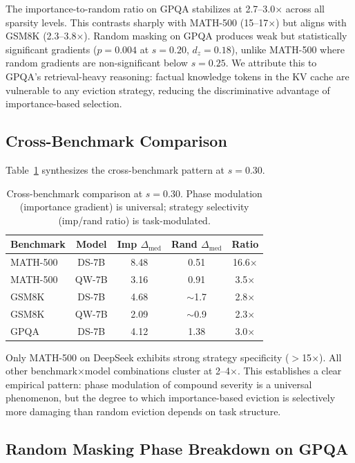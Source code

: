 \documentclass[11pt,a4paper]{article}
\begin{document}
The importance-to-random ratio on GPQA stabilizes at 2.7--3.0$\times$ across all sparsity levels. This contrasts sharply with MATH-500 (15--17$\times$) but aligns with GSM8K (2.3--3.8$\times$). Random masking on GPQA produces weak but statistically significant gradients ($p = 0.004$ at $s=0.20$, $d_z = 0.18$), unlike MATH-500 where random gradients are non-significant below $s=0.25$. We attribute this to GPQA's retrieval-heavy reasoning: factual knowledge tokens in the KV cache are vulnerable to any eviction strategy, reducing the discriminative advantage of importance-based selection.

\subsection{Cross-Benchmark Comparison}

Table~\ref{tab:cross_benchmark} synthesizes the cross-benchmark pattern at $s=0.30$.

\begin{table}[h]
\centering
\caption{Cross-benchmark comparison at $s=0.30$. Phase modulation (importance gradient) is universal; strategy selectivity (imp/rand ratio) is task-modulated.}
\label{tab:cross_benchmark}
\begin{tabular}{lcccc}
\toprule
Benchmark & Model & Imp $\Delta_{\text{med}}$ & Rand $\Delta_{\text{med}}$ & Ratio \\
\midrule
MATH-500 & DS-7B & 8.48 & 0.51 & 16.6$\times$ \\
MATH-500 & QW-7B & 3.16 & 0.91 & 3.5$\times$ \\
GSM8K & DS-7B & 4.68 & $\sim$1.7 & 2.8$\times$ \\
GSM8K & QW-7B & 2.09 & $\sim$0.9 & 2.3$\times$ \\
GPQA & DS-7B & 4.12 & 1.38 & 3.0$\times$ \\
\bottomrule
\end{tabular}
\end{table}

Only MATH-500 on DeepSeek exhibits strong strategy specificity ($>$15$\times$). All other benchmark$\times$model combinations cluster at 2--4$\times$. This establishes a clear empirical pattern: phase modulation of compound severity is a universal phenomenon, but the degree to which importance-based eviction is selectively more damaging than random eviction depends on task structure.

\subsection{Random Masking Phase Breakdown on GPQA}
\end{document}
